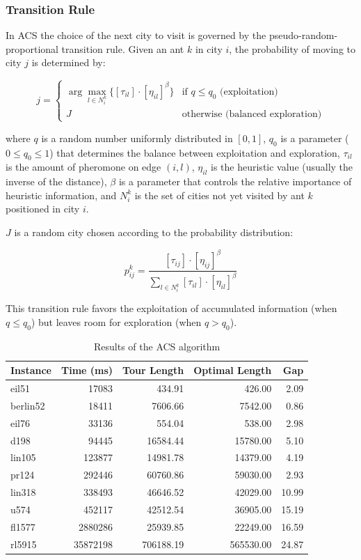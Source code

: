 \subsubsection{Transition Rule}
In \Gls{ACS} the choice of the next city to visit is governed by the pseudo-random-proportional transition rule. Given an ant $k$ in city $i$, the probability of moving to city $j$ is determined by:

\[
	j = \begin{cases}
		\arg\max_{l \in N_i^k} \{[\tau_{il}] \cdot [\eta_{il}]^\beta\} & \text{if }q \leq q_0 \text{ (exploitation)} \\
		J                                                              & \text{otherwise (balanced exploration)}
	\end{cases}
\]

where $q$ is a random number uniformly distributed in $[0,1]$, $q_0$ is a parameter ($0 \le q_0 \le 1$) that determines the balance between exploitation and exploration, $\tau_{il}$ is the amount of pheromone on edge $(i,l)$, $\eta_{il}$ is the heuristic value (usually the inverse of the distance), $\beta$ is a parameter that controls the relative importance of heuristic information, and $N_i^k$ is the set of cities not yet visited by ant $k$ positioned in city $i$.

$J$ is a random city chosen according to the probability distribution:

\[
	p_{ij}^k = \frac{[\tau_{ij}] \cdot [\eta_{ij}]^\beta}{\sum_{l \in N_i^k} [\tau_{il}] \cdot [\eta_{il}]^\beta}
\]

This transition rule favors the exploitation of accumulated information (when $q \leq q_0$) but leaves room for exploration (when $q > q_0$).


\begin{table}
	\centering
	\caption{Results of the ACS algorithm}
	\begin{tabular}{lrrrr}
		\toprule
		Instance & Time (ms) & Tour Length & Optimal Length & Gap   \\
		\midrule
		eil51    & 17083      & 434.91         & 426.00           & 2.09  \\
		berlin52 & 18411      & 7606.66        & 7542.00          & 0.86  \\
		eil76    & 33136      & 554.04         & 538.00           & 2.98  \\
		d198     & 94445      & 16584.44       & 15780.00         & 5.10  \\
		lin105   & 123877     & 14981.78       & 14379.00         & 4.19  \\
		pr124    & 292446     & 60760.86       & 59030.00         & 2.93  \\
		lin318   & 338493     & 46646.52       & 42029.00         & 10.99 \\
		u574     & 452117     & 42512.54       & 36905.00         & 15.19 \\
		fl1577   & 2880286    & 25939.85       & 22249.00         & 16.59 \\
		rl5915   & 35872198   & 706188.19      & 565530.00        & 24.87 \\
		\bottomrule
	\end{tabular}
\end{table}
